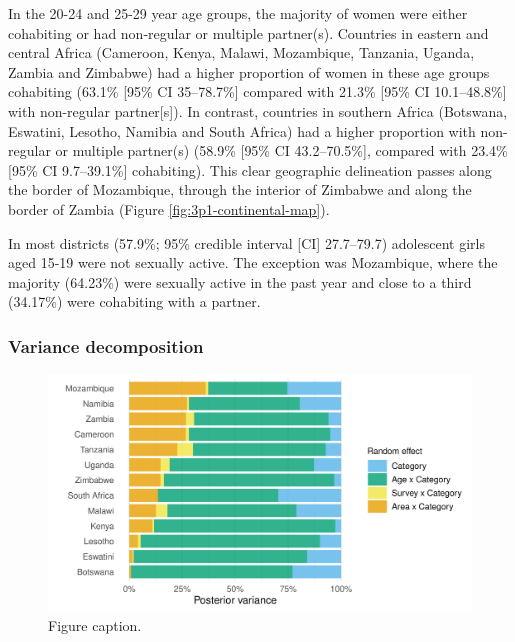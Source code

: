 \documentclass[a4paper, nobind]{templates/ociamthesis}
\begin{document}
In the 20-24 and 25-29 year age groups, the majority of women were either cohabiting or had non-regular or multiple partner(s).
Countries in eastern and central Africa (Cameroon, Kenya, Malawi, Mozambique, Tanzania, Uganda, Zambia and Zimbabwe) had a higher proportion of women in these age groups cohabiting (63.1\% {[}95\% CI 35--78.7\%{]} compared with 21.3\% {[}95\% CI 10.1--48.8\%{]} with non-regular partner{[}s{]}).
In contrast, countries in southern Africa (Botswana, Eswatini, Lesotho, Namibia and South Africa) had a higher proportion with non-regular or multiple partner(s) (58.9\% {[}95\% CI 43.2--70.5\%{]}, compared with 23.4\% {[}95\% CI 9.7--39.1\%{]} cohabiting).
This clear geographic delineation passes along the border of Mozambique, through the interior of Zimbabwe and along the border of Zambia (Figure \ref{fig:3p1-continental-map}).

In most districts (57.9\%; 95\% credible interval {[}CI{]} 27.7--79.7) adolescent girls aged 15-19 were not sexually active.
The exception was Mozambique, where the majority (64.23\%) were sexually active in the past year and close to a third (34.17\%) were cohabiting with a partner.

\hypertarget{variance-decomposition}{%
\subsubsection{Variance decomposition}\label{variance-decomposition}}



\begin{figure}

{\centering \includegraphics[width=0.95\linewidth]{resources/multi-agyw/20230627-144735-3da88508/depends/aaa-variance-proportions} 

}

\caption{Figure caption.}\label{fig:aaa-variance-proportions}
\end{figure}
\end{document}
